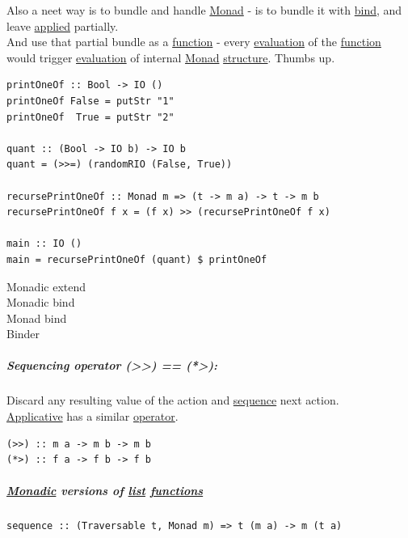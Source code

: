 \documentclass[a4paper,14pt,oneside]{book}
\begin{document}
Also a neet way is to bundle and handle \hyperref[org0668aa4]{Monad} - is to bundle it with \hyperref[org021ef79]{bind}, and leave \hyperref[orga89349a]{applied} partially.\\
And use that partial bundle as a \hyperref[org3b87f30]{function} - every \hyperref[orga8252a3]{evaluation} of the \hyperref[org3b87f30]{function} would trigger \hyperref[orga8252a3]{evaluation} of internal \hyperref[org0668aa4]{Monad} \hyperref[org6446676]{structure}. Thumbs up.\\
\begin{verbatim}
printOneOf :: Bool -> IO ()
printOneOf False = putStr "1"
printOneOf  True = putStr "2"

quant :: (Bool -> IO b) -> IO b
quant = (>>=) (randomRIO (False, True))

recursePrintOneOf :: Monad m => (t -> m a) -> t -> m b
recursePrintOneOf f x = (f x) >> (recursePrintOneOf f x)

main :: IO ()
main = recursePrintOneOf (quant) $ printOneOf
\end{verbatim}

\subsubparagraph{\emph{*}}
\label{sec:orge3174e8}

\label{org9feebcc}Monadic extend\\
\label{org5e9b5ba}Monadic bind\\
\label{orgb798c07}Monad bind\\
\label{org1370e80}Binder\\

\subsubsubparagraph{(>>=)}
\label{sec:org76be071}

\subsubsubparagraph{>>=}
\label{sec:org556c462}

\subsubsubparagraph{(=<<)}
\label{sec:org7aa999c}

\subsubsubparagraph{=<<}
\label{sec:org7c012d4}

\subparagraph{\label{org8f91137}Sequencing operator (>>) == (*>):}
\label{sec:org394cb65}
Discard any resulting value of the action and \hyperref[org6bed0d9]{sequence} next action.\\
\hyperref[org127abc4]{Applicative} has a similar \hyperref[orgdf912f7]{operator}.\\
\begin{verbatim}
(>>) :: m a -> m b -> m b
(*>) :: f a -> f b -> f b
\end{verbatim}

\subparagraph{\hyperref[org4586c68]{Monadic} versions of \hyperref[orgc96f8dc]{list} \hyperref[org97ed87c]{functions}}
\label{sec:org889f97d}
\begin{verbatim}
sequence :: (Traversable t, Monad m) => t (m a) -> m (t a)
\end{verbatim}
\end{document}
